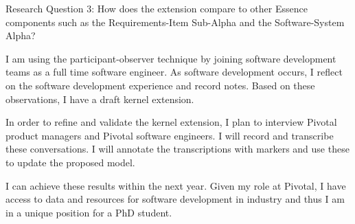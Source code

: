 \documentclass[preprint,12pt,3p]{elsarticle}
\begin{document}
Research Question 3: How does the extension compare to other Essence components such as the Requirements-Item Sub-Alpha and the Software-System Alpha? 

I am using the participant-observer technique by joining software development teams as a full time software engineer. As software development occurs, I reflect on the software development experience and record notes. Based on these observations, I have a draft kernel extension.

In order to refine and validate the kernel extension, I plan to interview Pivotal product managers and Pivotal software engineers. I will record and transcribe these conversations. I will annotate the transcriptions with markers and use these to update the proposed model.

I can achieve these results within the next year. Given my role at Pivotal, I have access to data and resources for software development in industry and thus I am in a unique position for a PhD student.  



\end{document}
